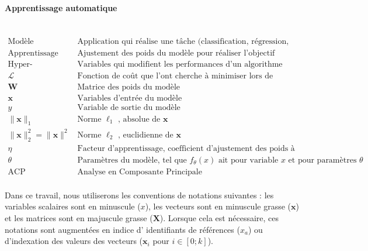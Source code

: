\paragraph{Apprentissage automatique}\mbox{} \\
$
\begin{array}{ll}
{\text{Modèle}} & {\text{Application qui réalise une tâche (classification, régression, etc.)}} \\
{\text{Apprentissage}} & {\text{Ajustement des poids du modèle pour réaliser l'objectif}} \\
{\text{Hyper-paramètres}} & {\text{Variables qui modifient les performances d'un algorithme d'apprentissage}} \\
{\mathcal{L}} & {\text{Fonction de coût que l'ont cherche à minimiser lors de l'apprentissage d'un modèle}}\\
{\mathbf{W}} & {\text{Matrice des poids du modèle}} \\
{\mathbf{x}} & {\text{Variables d'entrée du modèle}} \\
{y} & {\text{Variable de sortie du modèle}} \\
{\|\mathbf{x}\|_1} & {\text{Norme } \ell_{1} \text{ , absolue de }\mathbf{x}} \\
{\|\mathbf{x}\|_2^2 = \|\mathbf{x}\|^2} & {\text{Norme } \ell_{2} \text{ , euclidienne de }\mathbf{x}} \\
{\eta} & {\text {Facteur d'apprentissage, coefficient d'ajustement des poids à chaque itération}} \\
{\theta} & {\text{Paramètres du modèle, tel que } f_{\theta}(x) \text{ ait pour variable } x \text{ et pour paramètres } \theta} \\
{\text{ACP}} & {\text{Analyse en Composante Principale}} \\
\end{array}
$

\vspace{5mm} %
Dans ce travail, nous utiliserons les conventions de notations suivantes : les variables scalaires sont en minuscule ($x$), les vecteurs sont en minuscule grasse ($\mathbf{x}$) et les matrices sont en majuscule grasse ($\mathbf{X}$).
Lorsque cela est nécessaire, ces notations sont augmentées en indice d' identifiants de références ($x_a$) ou d'indexation des valeurs des vecteurs ($\mathbf{x}_i$ pour $i \in [0 ; k]$).
